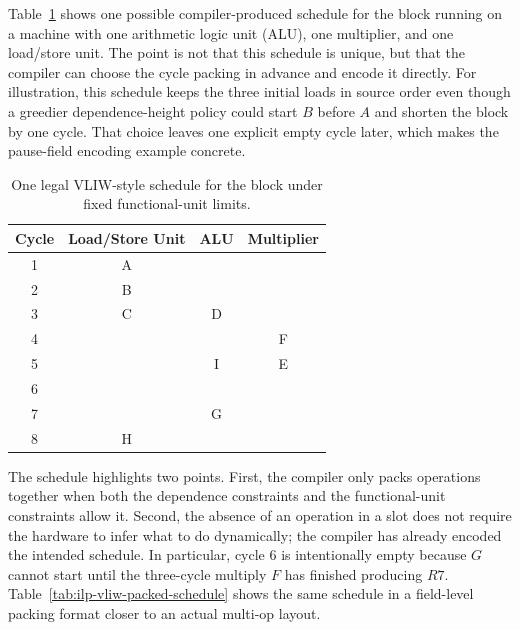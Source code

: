 Table~\ref{tab:ilp-vliw-schedule} shows one possible compiler-produced schedule for the block running on a machine with one arithmetic logic unit (ALU), one multiplier, and one load/store unit.
The point is not that this schedule is unique, but that the compiler can choose the cycle packing in advance and encode it directly.
For illustration, this schedule keeps the three initial loads in source order even though a greedier dependence-height policy could start $B$ before $A$ and shorten the block by one cycle.
That choice leaves one explicit empty cycle later, which makes the pause-field encoding example concrete.
\begin{table}[!b]
    \centering
    \renewcommand{\arraystretch}{1.15}
    \begin{tabular}{|c|c|c|c|}
        \hline
        Cycle & Load/Store Unit & ALU & Multiplier \\
        \hline
        1     & A               &     &            \\
        \hline
        2     & B               &     &            \\
        \hline
        3     & C               & D   &            \\
        \hline
        4     &                 &     & F          \\
        \hline
        5     &                 & I   & E          \\
        \hline
        6     &                 &     &            \\
        \hline
        7     &                 & G   &            \\
        \hline
        8     & H               &     &            \\
        \hline
    \end{tabular}
    \caption{One legal VLIW-style schedule for the block under fixed functional-unit limits.}
    \label{tab:ilp-vliw-schedule}
\end{table}
The schedule highlights two points.
First, the compiler only packs operations together when both the dependence constraints and the functional-unit constraints allow it.
Second, the absence of an operation in a slot does not require the hardware to infer what to do dynamically; the compiler has already encoded the intended schedule.
In particular, cycle 6 is intentionally empty because $G$ cannot start until the three-cycle multiply $F$ has finished producing $R7$.
Table~\ref{tab:ilp-vliw-packed-schedule} shows the same schedule in a field-level packing format closer to an actual multi-op layout.
